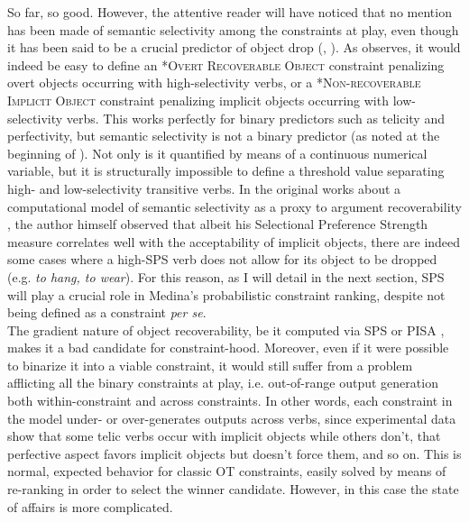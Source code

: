 So far, so good. However, the attentive reader will have noticed that no mention has been made of semantic selectivity among the constraints at play, even though it has been said to be a crucial predictor of object drop (, ). As \textcite[76]{Medina2007} observes, it would indeed be easy to define an \textsc{*Overt Recoverable Object} constraint penalizing overt objects occurring with high-selectivity verbs, or a \textsc{*Non-recoverable Implicit Object} constraint penalizing implicit objects occurring with low-selectivity verbs. This works perfectly for binary predictors such as telicity and perfectivity, but semantic selectivity is not a binary predictor (as noted at the beginning of ). Not only is it quantified by means of a continuous numerical variable, but it is structurally impossible to define a threshold value separating high- and low-selectivity transitive verbs. In the original works about a computational model of semantic selectivity as a proxy to argument recoverability \parencite{Resnik1993, Resnik1996}, the author himself observed that albeit his Selectional Preference Strength measure correlates well with the acceptability of implicit objects, there are indeed some cases where a high-SPS verb does not allow for its object to be dropped (e.g. \textit{to hang, to wear}). For this reason, as I will detail in the next section, SPS will play a crucial role in Medina's probabilistic constraint ranking, despite not being defined as a constraint \textit{per se}.\\
The gradient nature of object recoverability, be it computed via SPS \parencite{Resnik1993, Resnik1996} or PISA \parencite{CappelliLenciPISA}, makes it a bad candidate for constraint-hood. Moreover, even if it were possible to binarize it into a viable constraint, it would still suffer from a problem afflicting all the binary constraints at play, i.e. out-of-range output generation both within-constraint and across constraints. In other words, each constraint in the model under- or over-generates outputs across verbs, since experimental data show that some telic verbs occur with implicit objects while others don't, that perfective aspect favors implicit objects but doesn't force them, and so on. This is normal, expected behavior for classic OT constraints, easily solved by means of re-ranking in order to select the winner candidate. However, in this case the state of affairs is more complicated.\\
